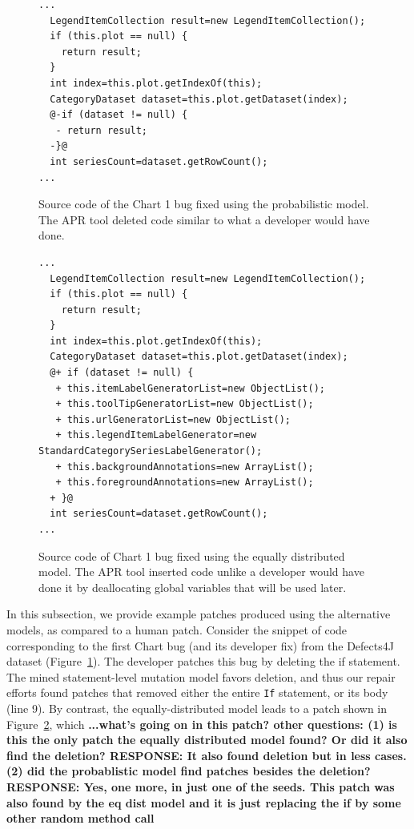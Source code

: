 \documentclass[conference]{IEEEtran}
\newcommand{\todo}[1]
  {{\scriptsize \textbf{\color{red} {#1}}}}
\begin{document}
\begin{figure}[t]
\begin{lstlisting}[frame=single,style=base]
...
  LegendItemCollection result=new LegendItemCollection();
  if (this.plot == null) {
    return result;
  }
  int index=this.plot.getIndexOf(this);
  CategoryDataset dataset=this.plot.getDataset(index);
  @-if (dataset != null) {
   - return result;
  -}@
  int seriesCount=dataset.getRowCount();
...
	\end{lstlisting}
	\caption{Source code of the Chart 1 bug fixed using the probabilistic model. The APR tool deleted code similar to what a developer would have done.\label{fig:chart1.1}}
\end{figure}

\begin{figure}[t]
\begin{lstlisting}[frame=single,style=base]
...
  LegendItemCollection result=new LegendItemCollection();
  if (this.plot == null) {
    return result;
  }
  int index=this.plot.getIndexOf(this);
  CategoryDataset dataset=this.plot.getDataset(index);
  @+ if (dataset != null) { 
   + this.itemLabelGeneratorList=new ObjectList();
   + this.toolTipGeneratorList=new ObjectList();
   + this.urlGeneratorList=new ObjectList();
   + this.legendItemLabelGenerator=new StandardCategorySeriesLabelGenerator();
   + this.backgroundAnnotations=new ArrayList();
   + this.foregroundAnnotations=new ArrayList();
  + }@
  int seriesCount=dataset.getRowCount();
...
	\end{lstlisting}
	\caption{Source code of Chart 1 bug fixed using the equally distributed model. The APR tool inserted code unlike a developer would have done it by deallocating global variables that will be used later.	\label{fig:chart1.3}}

\end{figure}


In this subsection, we provide example patches produced using the alternative
models, as compared to a human patch.  Consider the snippet of code corresponding
to the first Chart bug (and its developer fix) from the Defects4J dataset
(Figure~\ref{fig:chart1.1}).  The developer patches this bug by deleting the if
statement.  The mined statement-level mutation model favors deletion, and thus
our repair efforts found patches that removed either the entire \texttt{If} statement, or its body (line 9).
By contrast, the equally-distributed model leads to a patch shown in
Figure~\ref{fig:chart1.3}, which \todo{...what's going on in this patch? other
  questions: (1) is this the only patch the equally distributed model 
  found?  Or did it also find the deletion? RESPONSE: It also found deletion but in less cases. (2) did the probablistic model find patches besides the deletion? RESPONSE: Yes, one more, in just one of the seeds. This patch was also found by the eq dist model and it is just replacing the if by some other random method call}
\end{document}
